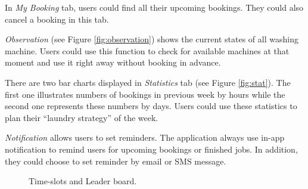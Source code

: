 In \emph{My Booking} tab, users could find all their upcoming bookings. They could also cancel a booking in this tab.

 \emph{Observation} (see Figure \ref{fig:observation}) shows the current states of all washing machine. Users could use this function to check for available machines at that moment and use it right away without booking in advance.

There are two bar charts displayed in \emph{Statistics} tab (see Figure \ref{fig:stat}). The first one illustrates numbers of bookings in previous week by hours while the second one represents these numbers by days. Users could use these statistics to plan their ``laundry strategy'' of the week.

\emph{Notification} allows users to set reminders. The application always use in-app notification to remind users for upcoming bookings or finished jobs. In addition, they could choose to set reminder by email or SMS message.
\begin{figure}[h]%
    \centering
		\caption{Time-slots and Leader board.}%
    \label{fig:figure5}
\end{figure}

